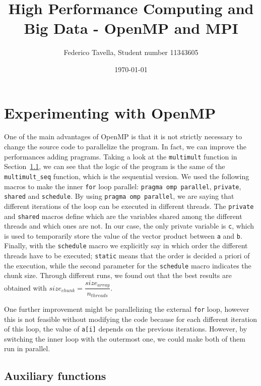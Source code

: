 \documentclass[a4paper]{article}
\title{High Performance Computing and Big Data - OpenMP and MPI}
\author{Federico Tavella, Student number 11343605}
\date{\today}
\begin{document}
\maketitle

\section{Experimenting with OpenMP}

One of the main advantages of OpenMP is that it is not strictly necessary to change the source code to parallelize the program. In fact, we can improve the performances adding pragrams. Taking a look at the \texttt{multimult} function in Section~\ref{subsec:ausiliary}, we can see that the logic of the program is the same of the \texttt{multimult\_seq} function, which is the sequential version. We used the following macros to make the inner \texttt{for} loop parallel: \texttt{pragma omp parallel}, \texttt{private}, \texttt{shared} and \texttt{schedule}. By using \texttt{pragma omp parallel}, we are saying that different iterations of the loop can be executed in different threads. The \texttt{private} and \texttt{shared} macros define which are the variables shared among the different threads and which ones are not. In our case, the only private variable is \texttt{c}, which is used to temporarily store the value of the vector product between \texttt{a} and \texttt{b}. Finally, with the \texttt{schedule} macro we explicitly say in which order the different threads have to be executed; \texttt{static} means that the order is decided a priori of the execution, while the second parameter for the \texttt{schedule} macro indicates the chunk size. Through different runs, we found out that the best results are obtained with $size_{chunk} = \dfrac{size_{array}}{n_{threads}}$.

One further improvement might be parallelizing the external \texttt{for} loop, however this is not feasible without modifying the code because for each different iteration of this loop, the value of \texttt{a[i]} depends on the previous iterations. However, by switching the inner loop with the outermost one, we could make both of them run in parallel.

\subsection{Auxiliary functions}\label{subsec:ausiliary}
\end{document}
